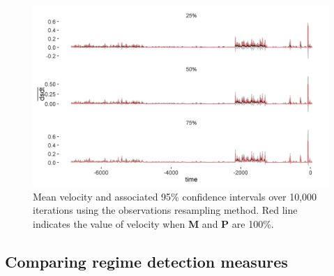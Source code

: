 \documentclass[print]{nuthesis}
\begin{document}
\begin{figure}
\includegraphics[width=0.85\linewidth]{./chapterFiles/resampling/figsCalledInDiss/dsdt_observations_ribboned_facetByProb} \caption{Mean velocity and associated 95\% confidence intervals over 10,000 iterations using the observations resampling method. Red line indicates the value of velocity when \textbf{M} and \textbf{P} are 100\%.}\label{fig:dsdtResamp}
\end{figure}
\hypertarget{comparing-regime-detection-measures}{%
\subsection{Comparing regime detection measures}\label{comparing-regime-detection-measures}}
\end{document}
